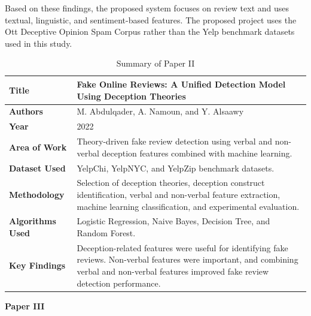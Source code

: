 \documentclass[12pt,a4paper]{report}
\begin{document}
Based on these findings, the proposed system focuses on review text and uses textual, linguistic, and sentiment-based features. The proposed project uses the Ott Deceptive Opinion Spam Corpus rather than the Yelp benchmark datasets used in this study.

\begin{table}[H]
\centering
\small
\renewcommand{\arraystretch}{1.3}

\begin{tabularx}{0.95\textwidth}{|p{}|X|}
\hline
\textbf{Title} &
Fake Online Reviews: A Unified Detection Model Using Deception Theories \\
\hline

\textbf{Authors} &
M. Abdulqader, A. Namoun, and Y. Alsaawy \\
\hline

\textbf{Year} &
2022 \\
\hline

\textbf{Area of Work} &
Theory-driven fake review detection using verbal and non-verbal deception features combined with machine learning. \\
\hline

\textbf{Dataset Used} &
YelpChi, YelpNYC, and YelpZip benchmark datasets. \\
\hline

\textbf{Methodology} &
Selection of deception theories, deception construct identification, verbal and non-verbal feature extraction, machine learning classification, and experimental evaluation. \\
\hline

\textbf{Algorithms Used} &
Logistic Regression, Naive Bayes, Decision Tree, and Random Forest. \\
\hline

\textbf{Key Findings} &
Deception-related features were useful for identifying fake reviews. Non-verbal features were important, and combining verbal and non-verbal features improved fake review detection performance. \\
\hline

\end{tabularx}

\caption{Summary of Paper II}
\label{tab:paper2}
\end{table}


\newpage

\textbf{Paper III}
\end{document}

